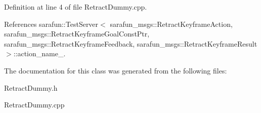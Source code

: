 Definition at line 4 of file Retract\-Dummy.\-cpp.



References sarafun\-::\-Test\-Server$<$ sarafun\-\_\-msgs\-::\-Retract\-Keyframe\-Action, sarafun\-\_\-msgs\-::\-Retract\-Keyframe\-Goal\-Const\-Ptr, sarafun\-\_\-msgs\-::\-Retract\-Keyframe\-Feedback, sarafun\-\_\-msgs\-::\-Retract\-Keyframe\-Result $>$\-::action\-\_\-name\-\_\-.



The documentation for this class was generated from the following files\-:\begin{DoxyCompactItemize}
\item 
Retract\-Dummy.\-h\item 
Retract\-Dummy.\-cpp\end{DoxyCompactItemize}
